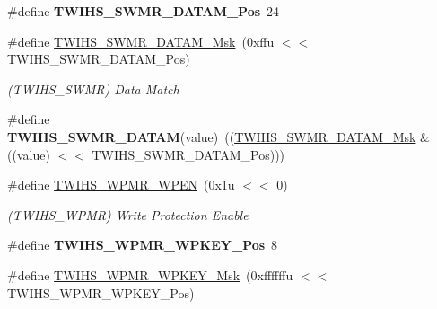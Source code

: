 \begin{DoxyCompactItemize}
\item 
\mbox{\label{group__SAMS70__TWIHS_ga34b88e4924a202bc799ac6d80677c145}} 
\#define {\bfseries T\+W\+I\+H\+S\+\_\+\+S\+W\+M\+R\+\_\+\+D\+A\+T\+A\+M\+\_\+\+Pos}~24
\item 
\mbox{\label{group__SAMS70__TWIHS_ga44cb1df1e94861a9fbb62974a8730e2f}} 
\#define \mbox{\hyperlink{group__SAMS70__TWIHS_ga44cb1df1e94861a9fbb62974a8730e2f}{T\+W\+I\+H\+S\+\_\+\+S\+W\+M\+R\+\_\+\+D\+A\+T\+A\+M\+\_\+\+Msk}}~(0xffu $<$$<$ T\+W\+I\+H\+S\+\_\+\+S\+W\+M\+R\+\_\+\+D\+A\+T\+A\+M\+\_\+\+Pos)
\begin{DoxyCompactList}\small\item\em (T\+W\+I\+H\+S\+\_\+\+S\+W\+MR) Data Match \end{DoxyCompactList}\item 
\mbox{\label{group__SAMS70__TWIHS_gaf81684051694e1b944089298917c1dcf}} 
\#define {\bfseries T\+W\+I\+H\+S\+\_\+\+S\+W\+M\+R\+\_\+\+D\+A\+T\+AM}(value)~((\mbox{\hyperlink{group__SAMV71__TWIHS_ga44cb1df1e94861a9fbb62974a8730e2f}{T\+W\+I\+H\+S\+\_\+\+S\+W\+M\+R\+\_\+\+D\+A\+T\+A\+M\+\_\+\+Msk}} \& ((value) $<$$<$ T\+W\+I\+H\+S\+\_\+\+S\+W\+M\+R\+\_\+\+D\+A\+T\+A\+M\+\_\+\+Pos)))
\item 
\mbox{\label{group__SAMS70__TWIHS_ga0f5bbcefe4e29b43633d06b7a4d08c45}} 
\#define \mbox{\hyperlink{group__SAMS70__TWIHS_ga0f5bbcefe4e29b43633d06b7a4d08c45}{T\+W\+I\+H\+S\+\_\+\+W\+P\+M\+R\+\_\+\+W\+P\+EN}}~(0x1u $<$$<$ 0)
\begin{DoxyCompactList}\small\item\em (T\+W\+I\+H\+S\+\_\+\+W\+P\+MR) Write Protection Enable \end{DoxyCompactList}\item 
\mbox{\label{group__SAMS70__TWIHS_ga8d7157d7e310207cbaad1dc4f2773c6d}} 
\#define {\bfseries T\+W\+I\+H\+S\+\_\+\+W\+P\+M\+R\+\_\+\+W\+P\+K\+E\+Y\+\_\+\+Pos}~8
\item 
\mbox{\label{group__SAMS70__TWIHS_gad433cad3185d19b00f7c05e49cbd7e13}} 
\#define \mbox{\hyperlink{group__SAMS70__TWIHS_gad433cad3185d19b00f7c05e49cbd7e13}{T\+W\+I\+H\+S\+\_\+\+W\+P\+M\+R\+\_\+\+W\+P\+K\+E\+Y\+\_\+\+Msk}}~(0xffffffu $<$$<$ T\+W\+I\+H\+S\+\_\+\+W\+P\+M\+R\+\_\+\+W\+P\+K\+E\+Y\+\_\+\+Pos)

\end{DoxyCompactItemize}
